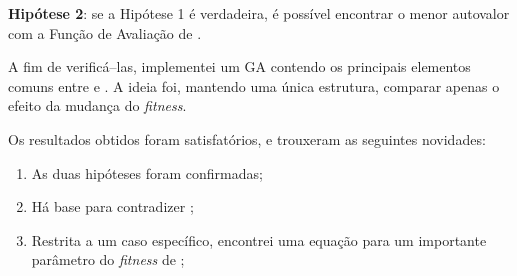 	\textbf{Hipótese 2}: se a Hipótese 1 é verdadeira, é possível encontrar o menor autovalor com a Função de Avaliação de \cite{metodo2011}.
		
	A fim de verificá--las, implementei um GA contendo os principais elementos comuns entre \cite{metodo2004} e \cite{metodo2011}. A ideia foi, mantendo uma única estrutura, comparar apenas o efeito da mudança do \emph{fitness}.
	
	Os resultados obtidos foram satisfatórios, e trouxeram as seguintes novidades:
	
	\begin{enumerate}
		\item As duas hipóteses foram confirmadas;
		\item Há base para contradizer \cite{metodo2004};
		\item Restrita a um caso específico, encontrei uma equação para um importante parâmetro do \emph{fitness} de \cite{metodo2011};
	\end{enumerate}